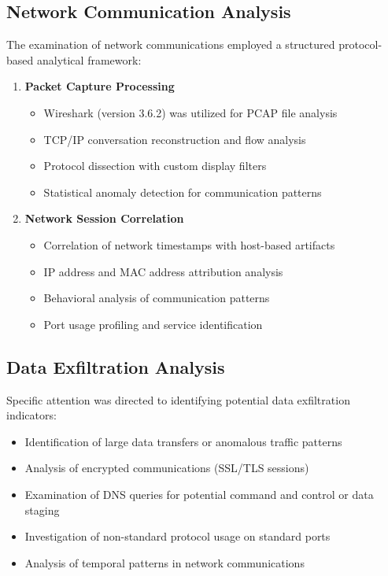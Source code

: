 \subsection{Network Communication Analysis}
The examination of network communications employed a structured protocol-based analytical framework:
\begin{enumerate}
    \item \textbf{Packet Capture Processing}
    \begin{itemize}
        \item Wireshark (version 3.6.2) was utilized for PCAP file analysis
        \item TCP/IP conversation reconstruction and flow analysis
        \item Protocol dissection with custom display filters
        \item Statistical anomaly detection for communication patterns
    \end{itemize}
    
    \item \textbf{Network Session Correlation}
    \begin{itemize}
        \item Correlation of network timestamps with host-based artifacts
        \item IP address and MAC address attribution analysis
        \item Behavioral analysis of communication patterns
        \item Port usage profiling and service identification
    \end{itemize}
\end{enumerate}

\subsection{Data Exfiltration Analysis}
Specific attention was directed to identifying potential data exfiltration indicators:
\begin{itemize}
    \item Identification of large data transfers or anomalous traffic patterns
    \item Analysis of encrypted communications (SSL/TLS sessions)
    \item Examination of DNS queries for potential command and control or data staging
    \item Investigation of non-standard protocol usage on standard ports
    \item Analysis of temporal patterns in network communications
\end{itemize}

